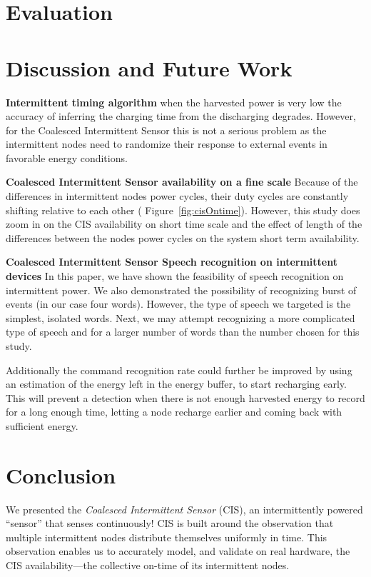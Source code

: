 \documentclass[sigconf, anonymous]{acmart}
\newcommand{\sys}{CIS\xspace}
\newcommand{\fullsys}{Coalesced Intermittent Sensor\xspace}
\begin{document}
\section{Evaluation}
\label{sec:evaluation}



\section{Discussion and Future Work}
\label{sec:discussion}

\noindent\textbf{Intermittent timing algorithm} when the harvested power is very low the accuracy of inferring the charging time from the discharging degrades. However, for the \fullsys this is not a serious problem as the intermittent nodes need to randomize their response to external events in favorable energy conditions. 

\noindent\textbf{\fullsys availability on a fine scale} Because of the differences in intermittent nodes power cycles, their duty cycles are constantly shifting relative to each other ( Figure~\ref{fig:cisOntime}).  However, this study does zoom in on the \sys availability on short time scale and the effect of length of the differences between the nodes power cycles on the system short term availability.   

\noindent\textbf{\fullsys Speech recognition on intermittent devices} In this paper, we have shown the feasibility of speech recognition on intermittent power. We also demonstrated the possibility of recognizing burst of events (in our case four words). However, the type of speech we targeted is the simplest, isolated words. Next, we may attempt recognizing a more complicated type of speech and for a larger number of words than the number chosen for this study.

Additionally the command recognition rate could further be improved by using an estimation of the energy left in the energy buffer, to start recharging early. This will prevent a detection when there is not enough harvested energy to record for a long enough time, letting a node recharge earlier and coming back with sufficient energy.

\section{Conclusion}

We presented the \textit{\fullsys} (\sys), an intermittently powered ``sensor'' that senses continuously! \sys is built around the observation that multiple intermittent nodes distribute themselves uniformly in time. This observation enables us to accurately model, and validate on real hardware, the \sys availability---the collective on-time of its intermittent nodes. 
\end{document}
